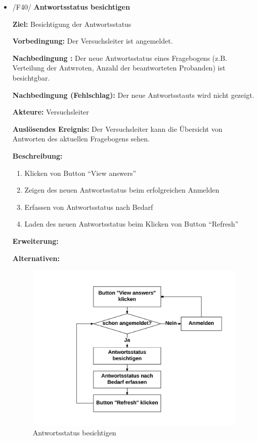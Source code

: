 \documentclass[a4paper]{scrreprt}
\begin{document}
\begin{itemize}
	
	            \item /F40/ \textbf{Antwortsstatus besichtigen}
	            \par \textbf{Ziel: }Besichtigung der Antwortsstatus
	            \par \textbf{Vorbedingung: }Der Versuchsleiter ist angemeldet.
	            \par \textbf{Nachbedingung : }Der neue Antwortsstatus eines Fragebogens (z.B. Verteilung der Antwroten, Anzahl der beantworteten Probanden) ist besichtgbar.
	            \par \textbf{Nachbedingung (Fehlschlag): }Der neue Antwortsstauts wird nicht gezeigt.
	            \par \textbf{Akteure: }Versuchsleiter
	            \par \textbf{Auslösendes Ereignis: }Der Versuchsleiter kann die \"Ubersicht von Antworten des aktuellen Fragebogens sehen.
	            \par \textbf{Beschreibung: }
	            \begin{enumerate}
	            	\item Klicken von Button ``View answers''
	            	\item Zeigen des neuen Antwortsstatus beim erfolgreichen Anmelden
	            	\item Erfassen von Antwortsstatus nach Bedarf
	            	\item Laden des neuen Antwortsstatus beim Klicken von Button ``Refresh''
	            \end{enumerate}
	            \par \textbf{Erweiterung: }
	            \par \textbf{Alternativen: }
	            \newpage
	            \begin{figure}[ht]
	            	\centering
	            	\includegraphics[scale=0.8]{Antwortsstatus_besichtigen.jpeg}
	            	\caption{Antwortsstatus besichtigen}
	            \end{figure}
	

\end{itemize}
\end{document}
